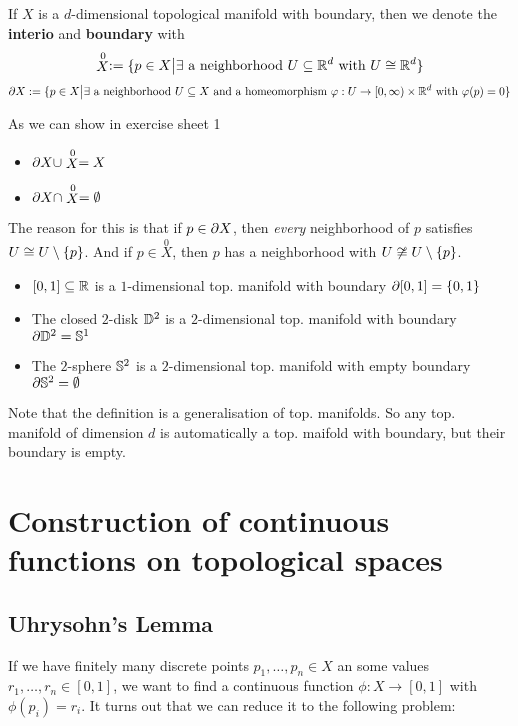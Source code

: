 If $X$ is a $d$-dimensional topological manifold with boundary, then we denote the \textbf{interio} and \textbf{boundary} with
\begin{align*}
  \stackrel{0}{X} := \{p \in X \big\vert \exists \text{ a neighborhood }U \subseteq \mathbb{R}^{d} \text{ with } U \cong \mathbb{R}^{d}\}
\end{align*}
\begin{align*}
  \partial X := \{p \in X \big\vert \exists \text{ a neighborhood } U \subseteq X \text{ and a homeomorphism } \varphi: U \to [0,\infty) \times \mathbb{R}^{d} \text{ with } \varphi(p) = 0\}
\end{align*}

As we can show in exercise sheet 1
\begin{itemize}
  \item $\partial X \cup \stackrel{0}{X} = X$
  \item $\partial X \cap \stackrel{0}{X} = \emptyset$
\end{itemize}
The reason for this is that if $p \in \partial X$, then \emph{every} neighborhood of $p$ satisfies $U \cong U \setminus \{p\}$.
And if $p \in \stackrel{0}{X}$, then $p$ has a neighborhood with $U \not\cong U \setminus \{p\}$.


\begin{ex}[]
\begin{itemize}
  \item $[0,1] \subseteq \mathbb{R}$ is a $1$-dimensional top. manifold with boundary $\partial [0,1] = \{0,1\}$
  \item The closed $2$-disk $\mathbb{D}^{2}$ is a $2$-dimensional top. manifold with boundary $\partial \mathbb{D}^{2} = \mathbb{S}^{1}$
  \item The $2$-sphere $\mathbb{S}^{2}$ is a $2$-dimensional top. manifold with empty boundary $\partial \mathbb{S}^{2} = \emptyset$
\end{itemize}
\end{ex}

Note that the definition is a generalisation of top. manifolds.
So any top. manifold of dimension $d$ is automatically a top. maifold with boundary, but their boundary is empty.



\section{Construction of continuous functions on topological spaces}
\subsection{Uhrysohn's Lemma}
If we have finitely many discrete points $p_1, \ldots, p_n \in X$ an some values $r_1, \ldots, r_n \in [0,1]$, we want to find a continuous function
$\phi: X \to  [0,1]$ with $\phi(p_i) = r_i$.
It turns out that we can reduce it to the following problem:

